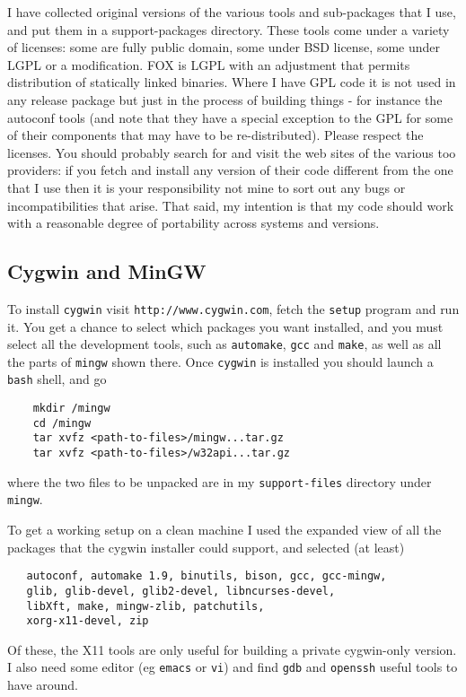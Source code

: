 \documentclass[11pt]{article}
\begin{document}
I have collected original versions of the various tools and
sub-packages that I use, and put them in a support-packages
directory. These tools come under a variety of licenses: some are
fully public domain, some under BSD license, some under LGPL or
a modification. FOX is LGPL with an adjustment that permits distribution
of statically linked binaries. Where I have GPL code it is not used
in any release package but just in the process of building things -
for instance the autoconf tools (and note that they have a special
exception to the GPL for some of their components that may have to
be re-distributed). Please respect the licenses. You should probably
search for and visit the web sites of the various too providers: if you
fetch and install any version of their code different from the one that
I use then it is your responsibility not mine to sort out any bugs or
incompatibilities that arise. That said, my intention is that my code
should work with a reasonable degree of portability across systems and
versions.

\subsection{Cygwin and MinGW}
To install \verb+cygwin+ visit \verb+http://www.cygwin.com+, fetch the
\verb+setup+ program and run it. You get a chance to select which packages
you want installed, and you must select all the development tools, such
as \verb+automake+, \verb+gcc+ and \verb+make+, as well as all the
parts of \verb+mingw+ shown there.  Once \verb+cygwin+ is installed you should
launch a \verb+bash+ shell, and go
\begin{verbatim}
    mkdir /mingw
    cd /mingw
    tar xvfz <path-to-files>/mingw...tar.gz
    tar xvfz <path-to-files>/w32api...tar.gz
\end{verbatim}
\noindent where the two files to be unpacked are in my \verb+support-files+
directory under \verb+mingw+.

To get a working setup on a clean machine I used the expanded view of all the
packages that the cygwin installer could support, and selected (at least)
\begin{verbatim}
   autoconf, automake 1.9, binutils, bison, gcc, gcc-mingw,
   glib, glib-devel, glib2-devel, libncurses-devel,
   libXft, make, mingw-zlib, patchutils,
   xorg-x11-devel, zip
\end{verbatim}
\noindent Of these, the X11 tools are only useful for building a
private cygwin-only version. I also need some editor (eg \verb.emacs.
or \verb.vi.) and find \verb.gdb. and \verb.openssh. useful tools
to have around.
\end{document}
